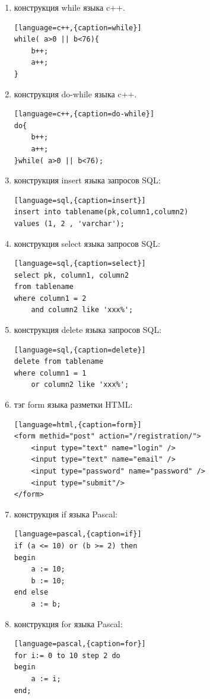 \documentclass[a4paper,12pt]{article}
\begin{document}
\begin{enumerate}
	\item конструкция while языка c++. 
\begin{lstlisting}[language=c++,{caption=while}]
while( a>0 || b<76){
	b++;
	a++;
}
\end{lstlisting}

	\item конструкция do-while языка c++. 
\begin{lstlisting}[language=c++,{caption=do-while}]
do{
	b++;
	a++;
}while( a>0 || b<76);
\end{lstlisting}

	\item конструкция insert языка запросов SQL:
\begin{lstlisting}[language=sql,{caption=insert}]
insert into tablename(pk,column1,column2) 
values (1, 2 , 'varchar');
\end{lstlisting}

	\item конструкция select языка запросов SQL:
\begin{lstlisting}[language=sql,{caption=select}]
select pk, column1, column2
from tablename
where column1 = 2 
	and column2 like 'xxx%';
\end{lstlisting}

	\item конструкция delete языка запросов SQL:
\begin{lstlisting}[language=sql,{caption=delete}]
delete from tablename
where column1 = 1
	or column2 like 'xxx%';
\end{lstlisting}

	\item тэг form языка разметки HTML: 
\begin{lstlisting}[language=html,{caption=form}]
<form methid="post" action="/registration/">
	<input type="text" name="login" />
	<input type="text" name="email" />
	<input type="password" name="password" />
	<input type="submit"/>
</form>
\end{lstlisting}

	\item конструкция if языка Pascal: 
\begin{lstlisting}[language=pascal,{caption=if}]
if (a <= 10) or (b >= 2) then
begin
	a := 10;
	b := 10;
end else
	a := b;

\end{lstlisting}

	\item конструкция for языка Pascal: 
\begin{lstlisting}[language=pascal,{caption=for}]
for i:= 0 to 10 step 2 do 
begin
	a := i;
end;
\end{lstlisting}

\end{enumerate}
\end{document}
